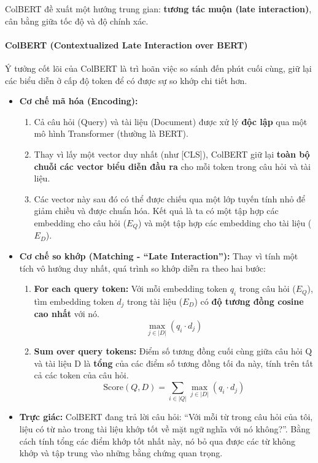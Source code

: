 ColBERT đề xuất một hướng trung gian: \textbf{tương tác muộn (late interaction)}, cân bằng giữa tốc độ và độ chính xác.

\paragraph{ColBERT (Contextualized Late Interaction over BERT)}
Ý tưởng cốt lõi của ColBERT là trì hoãn việc so sánh đến phút cuối cùng, giữ lại các biểu diễn ở cấp độ token để có được sự so khớp chi tiết hơn.

\begin{itemize}
	\item \textbf{Cơ chế mã hóa (Encoding):}
	\begin{enumerate}
		\item Cả câu hỏi (Query) và tài liệu (Document) được xử lý \textbf{độc lập} qua một mô hình Transformer (thường là BERT).
		\item Thay vì lấy một vector duy nhất (như [CLS]), ColBERT giữ lại \textbf{toàn bộ chuỗi các vector biểu diễn đầu ra} cho mỗi token trong câu hỏi và tài liệu.
		\item Các vector này sau đó có thể được chiếu qua một lớp tuyến tính nhỏ để giảm chiều và được chuẩn hóa. Kết quả là ta có một tập hợp các embedding cho câu hỏi ($E_Q$) và một tập hợp các embedding cho tài liệu ($E_D$).
	\end{enumerate}
	
	\item \textbf{Cơ chế so khớp (Matching - “Late Interaction”):}
	Thay vì tính một tích vô hướng duy nhất, quá trình so khớp diễn ra theo hai bước:
	\begin{enumerate}
		\item \textbf{For each query token:} Với mỗi embedding token $q_i$ trong câu hỏi ($E_Q$), tìm embedding token $d_j$ trong tài liệu ($E_D$) có \textbf{độ tương đồng cosine cao nhất} với nó.
		\[
		\max_{j \in |D|} (q_i \cdot d_j)
		\]
		\item \textbf{Sum over query tokens:} Điểm số tương đồng cuối cùng giữa câu hỏi Q và tài liệu D là \textbf{tổng} của các điểm số tương đồng tối đa này, tính trên tất cả các token của câu hỏi.
		\[
		\text{Score}(Q, D) = \sum_{i \in |Q|} \max_{j \in |D|} (q_i \cdot d_j)
		\]
	\end{enumerate}
	
	\item \textbf{Trực giác:} ColBERT đang trả lời câu hỏi: “Với mỗi từ trong câu hỏi của tôi, liệu có từ nào trong tài liệu khớp tốt về mặt ngữ nghĩa với nó không?”. Bằng cách tính tổng các điểm khớp tốt nhất này, nó bỏ qua được các từ không khớp và tập trung vào những bằng chứng quan trọng.
	

\end{itemize}
